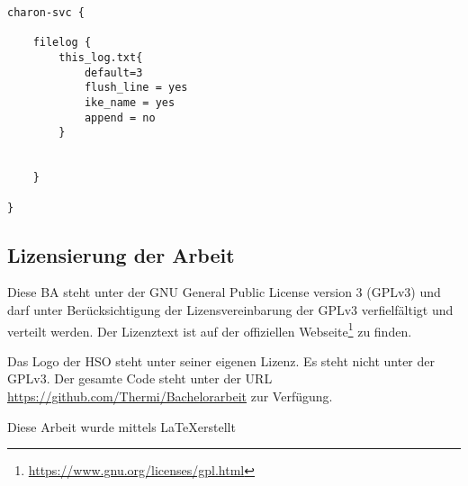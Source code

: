\begin{center}
\label{lst:strongswan.conf}
\begin{lstlisting}[caption=Testkonfiguration - strongswan.conf,numbers=none]
charon-svc {

	filelog {
		this_log.txt{
			default=3
			flush_line = yes
			ike_name = yes
			append = no
		}
		
	
	}

}
\end{lstlisting}
\end{center}


\subsection{Lizensierung der Arbeit}
Diese \ac{BA} steht unter der GNU General Public License version 3 (GPLv3)
und darf unter Berücksichtigung der Lizensvereinbarung der GPLv3 verfielfältigt
und verteilt werden. Der Lizenztext ist auf der offiziellen Webseite\footnote{\url{https://www.gnu.org/licenses/gpl.html}}
zu finden.

Das Logo der \ac{HSO} steht unter seiner eigenen Lizenz. Es steht nicht unter der GPLv3.
Der gesamte Code steht unter der URL \url{https://github.com/Thermi/Bachelorarbeit} zur Verfügung.

\begin{centering} 

Diese Arbeit wurde mittels \LaTeX erstellt
\end{centering}
